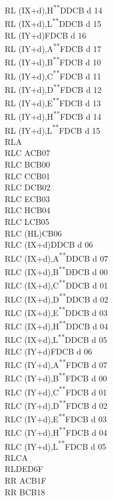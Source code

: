 \documentclass[12pt,twoside,openright,a4paper]{book}
\newcommand{\UNDOC}{\textnormal{\textsuperscript{**}}}
\begin{document}
\begin{multicols}{3}
{\begin{tabbing}
		RL (IX+d),H\UNDOC\>DDCB d 14\\
		RL (IX+d),L\UNDOC\>DDCB d 15\\
		RL (IY+d)\>FDCB d 16\\
		RL (IY+d),A\UNDOC\>FDCB d 17\\
		RL (IY+d),B\UNDOC\>FDCB d 10\\
		RL (IY+d),C\UNDOC\>FDCB d 11\\
		RL (IY+d),D\UNDOC\>FDCB d 12\\
		RL (IY+d),E\UNDOC\>FDCB d 13\\
		RL (IY+d),H\UNDOC\>FDCB d 14\\
		RL (IY+d),L\UNDOC\>FDCB d 15\\
		RLA\\
		RLC A\>CB07\\
		RLC B\>CB00\\
		RLC C\>CB01\\
		RLC D\>CB02\\
		RLC E\>CB03\\
		RLC H\>CB04\\
		RLC L\>CB05\\
		RLC (HL)\>CB06\\
		RLC (IX+d)\>DDCB d 06\\
		RLC (IX+d),A\UNDOC\>DDCB d 07\\
		RLC (IX+d),B\UNDOC\>DDCB d 00\\
		RLC (IX+d),C\UNDOC\>DDCB d 01\\
		RLC (IX+d),D\UNDOC\>DDCB d 02\\
		RLC (IX+d),E\UNDOC\>DDCB d 03\\
		RLC (IX+d),H\UNDOC\>DDCB d 04\\
		RLC (IX+d),L\UNDOC\>DDCB d 05\\
		RLC (IY+d)\>FDCB d 06\\
		RLC (IY+d),A\UNDOC\>FDCB d 07\\
		RLC (IY+d),B\UNDOC\>FDCB d 00\\
		RLC (IY+d),C\UNDOC\>FDCB d 01\\
		RLC (IY+d),D\UNDOC\>FDCB d 02\\
		RLC (IY+d),E\UNDOC\>FDCB d 03\\
		RLC (IY+d),H\UNDOC\>FDCB d 04\\
		RLC (IY+d),L\UNDOC\>FDCB d 05\\
		RLCA\\
		RLD\>ED6F\\
		RR A\>CB1F\\
		RR B\>CB18\\

\end{tabbing}}
\end{multicols}
\end{document}
